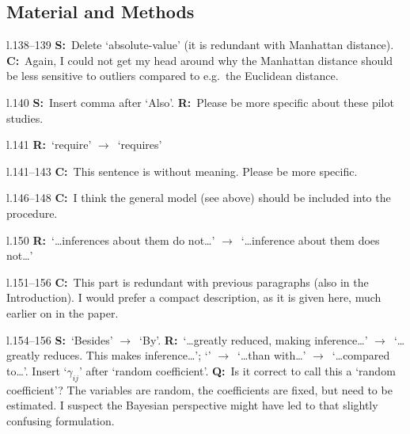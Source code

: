 \documentclass[11pt]{article}
\newenvironment{my_description}
{\begin{description}
  \setlength{\itemsep}{2pt}
  \setlength{\parskip}{0pt}
  \setlength{\parsep}{0pt}}
{\end{description}}
\newcommand{\ra}{$\rightarrow$\ }
\newcommand{\C}{\textbf{C:}\ }
\newcommand{\Q}{\textbf{Q:}\ }
\newcommand{\R}{\textbf{R:}\ }
\newcommand{\V}{\textbf{S:}\ }
\begin{document}
\subsection{Material and Methods}

\begin{my_description}

	\item [l.138--139] \V Delete `absolute-value' (it is redundant with Manhattan distance). \C Again, I could not get my head around why the Manhattan distance should be less sensitive to outliers compared to e.g.\ the Euclidean distance.

	\item [l.140] \V Insert comma after `Also'. \R Please be more specific about these pilot studies.
	\item [l.141] \R `require' \ra `requires'
	\item [l.141--143] \C This sentence is without meaning. Please be more specific.
	\item [l.146--148] \C I think the general model (see above) should be included into the procedure.
	\item [l.150] \R `\dots inferences about them do not\dots' \ra `\dots inference about them does not\dots'
	\item [l.151--156] \C This part is redundant with previous paragraphs (also in the Introduction). I would prefer a compact description, as it is given here, much earlier on in the paper.
	\item [l.154--156] \V `Besides' \ra `By'. \R `\dots greatly reduced, making inference\dots' \ra `\dots greatly reduces. This makes inference\dots'; `' \ra `\dots than with\dots' \ra `\dots compared to\dots'. Insert `$\gamma_{ij}$' after `random coefficient'. \Q Is it correct to call this a `random coefficient'? The variables are random, the coefficients are fixed, but need to be estimated. I suspect the Bayesian perspective might have led to that slightly confusing formulation.
	

\end{my_description}
\end{document}
